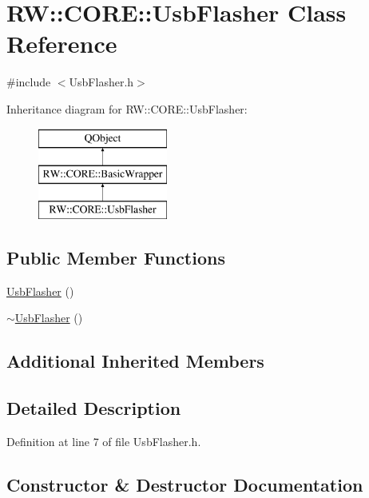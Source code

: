 \hypertarget{class_r_w_1_1_c_o_r_e_1_1_usb_flasher}{}\section{RW\+:\+:C\+O\+RE\+:\+:Usb\+Flasher Class Reference}
\label{class_r_w_1_1_c_o_r_e_1_1_usb_flasher}


{\ttfamily \#include $<$Usb\+Flasher.\+h$>$}

Inheritance diagram for RW\+:\+:C\+O\+RE\+:\+:Usb\+Flasher\+:\begin{figure}[H]
\begin{center}
\leavevmode
\includegraphics[height=3.000000cm]{class_r_w_1_1_c_o_r_e_1_1_usb_flasher}
\end{center}
\end{figure}
\subsection*{Public Member Functions}
\begin{DoxyCompactItemize}
\item 
\hyperlink{class_r_w_1_1_c_o_r_e_1_1_usb_flasher_a5c10a755b00ae95db557b572445b657c}{Usb\+Flasher} ()
\item 
\hyperlink{class_r_w_1_1_c_o_r_e_1_1_usb_flasher_a8ee30958b7e2fb03a7887f945cfd9698}{$\sim$\+Usb\+Flasher} ()
\end{DoxyCompactItemize}
\subsection*{Additional Inherited Members}


\subsection{Detailed Description}


Definition at line 7 of file Usb\+Flasher.\+h.



\subsection{Constructor \& Destructor Documentation}
\hypertarget{class_r_w_1_1_c_o_r_e_1_1_usb_flasher_a5c10a755b00ae95db557b572445b657c}{}\label{class_r_w_1_1_c_o_r_e_1_1_usb_flasher_a5c10a755b00ae95db557b572445b657c} 
